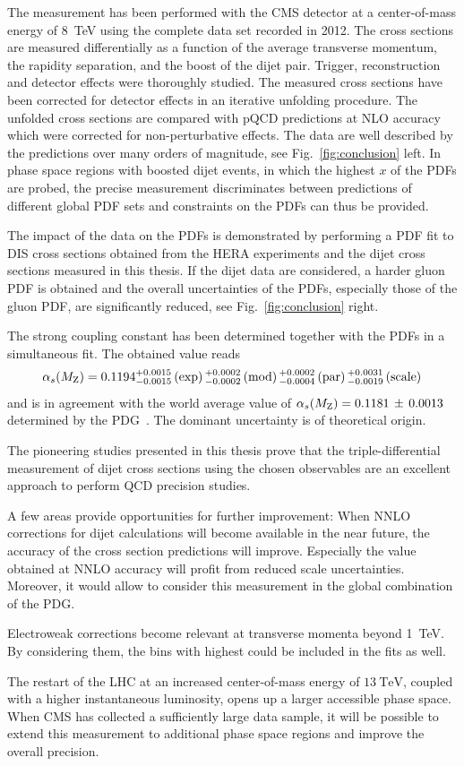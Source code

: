 The measurement has been performed with the CMS detector at a center-of-mass
energy of \SI{8}{\TeV} using the complete data set recorded in 2012. The cross
sections are measured differentially as a function of the average transverse
momentum, the rapidity separation, and the boost of the dijet pair. Trigger,
reconstruction and detector effects were thoroughly studied. The measured cross
sections have been corrected for detector effects in an iterative unfolding
procedure. The unfolded cross sections are compared with pQCD predictions at NLO
accuracy which were corrected for non-perturbative effects. The data are well
described by the predictions over many orders of magnitude, see
Fig.~\ref{fig:conclusion} left. In phase space regions with boosted dijet
events, in which the highest $x$ of the PDFs are probed, the precise measurement
discriminates between predictions of different global PDF sets and constraints
on the PDFs can thus be provided. 

The impact of the data on the PDFs is demonstrated by performing a PDF fit to
DIS cross sections obtained from the HERA experiments and the dijet cross
sections measured in this thesis. If the dijet data are considered, a harder
gluon PDF is obtained and the overall uncertainties of the PDFs, especially
those of the gluon PDF, are significantly reduced, see Fig.~\ref{fig:conclusion}
right.

The strong coupling constant \asmz has been determined together with the PDFs in
a simultaneous fit. The obtained value reads
%
\begin{equation*}
    \alpha_{s}(M_\mathrm{Z}) = 0.1194_{-0.0015}^{+0.0015}\,(\mathrm{exp})\,
    {}_{-0.0002}^{+0.0002}\,(\mathrm{mod})\,{}_{-0.0004}^{+0.0002}\,(\mathrm{par})\,
    {}_{-0.0019}^{+0.0031}\,(\mathrm{scale})\,
\end{equation*}
%
and is in agreement with the world average value of $\alpha_{s}(M_\mathrm{Z}) = 0.1181 \,\pm\,
0.0013$ determined by the PDG~\cite{Agashe:2014kda}. The dominant uncertainty is
of theoretical origin.

The pioneering studies presented in this thesis prove that the
triple-differential measurement of dijet cross sections using the chosen
observables are an excellent approach to perform QCD precision studies.

A few areas provide opportunities for further improvement: When NNLO corrections
for dijet calculations will become available in the near future, the accuracy of
the cross section predictions will improve. Especially the \asmz value obtained
at NNLO accuracy will profit from reduced scale uncertainties.  Moreover, it
would allow to consider this measurement in the global \asmz combination of the
PDG.

Electroweak corrections become relevant at transverse momenta beyond
\SI{1}{\TeV}. By considering them, the bins with highest \ptavg could be
included in the fits as well.

The restart of the LHC at an increased center-of-mass energy of $\SI{13}{\TeV}$,
coupled with a higher instantaneous luminosity, opens up a larger accessible
phase space. When CMS has collected a sufficiently large data sample, it will be
possible to extend this measurement to additional phase space regions and
improve the overall precision.

